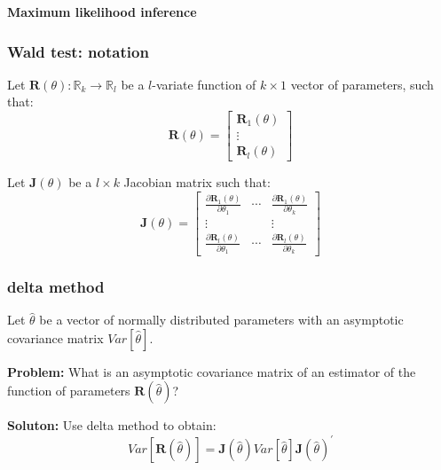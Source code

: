 \documentclass[notes,blackandwhite,mathsans]{beamer}
\begin{document}
{
\begin{frame}

\begin{adjustwidth}{-0.5cm}{0cm}
\vspace{8.3cm}\Large
\textbf{{\color{mcxs5}Maximum likelihood} {\color{mcxs2}inference}}
\end{adjustwidth}

\end{frame}
}



\begin{frame}
\frametitle{Wald test: notation}
\small

{\color{mcxs3}Let} $\mathbf{R}(\theta): \mathbb{R}_k\rightarrow\mathbb{R}_l$ {\color{mcxs3}be a} $l${\color{mcxs3}-variate function of} $k\times 1$ {\color{mcxs3}vector of parameters, such that:}
$$ \mathbf{R}(\theta) = \begin{bmatrix} \mathbf{R}_1(\theta) \\ \vdots \\ \mathbf{R}_l(\theta) \end{bmatrix} $$

{\color{mcxs3}Let} $\mathbf{J}(\theta)$ {\color{mcxs3}be a} $l\times k$ {\color{mcxs2}Jacobian matrix} {\color{mcxs3}such that:}
$$ \mathbf{J}(\theta) = \begin{bmatrix} \frac{\partial\mathbf{R}_1(\theta)}{\partial\theta_1} & \cdots & \frac{\partial\mathbf{R}_1(\theta)}{\partial\theta_k} \\ \vdots & & \vdots \\ \frac{\partial\mathbf{R}_l(\theta)}{\partial\theta_1} & \cdots & \frac{\partial\mathbf{R}_l(\theta)}{\partial\theta_k} \end{bmatrix} $$
\end{frame}


\begin{frame}
\frametitle{delta method}
\small

{\color{mcxs3}Let} $\hat\theta$ {\color{mcxs3}be a vector of {\color{mcxs2}normally distributed} parameters with an asymptotic covariance matrix} $Var[\hat\theta]$.

\vspace{1cm}\textbf{Problem:} {\color{mcxs3}What is an {\color{mcxs2}asymptotic} covariance matrix of an estimator of the  function of parameters} $\mathbf{R}(\hat\theta)$?

\vspace{1cm}\textbf{Soluton:} {\color{mcxs3}Use} delta method {\color{mcxs3}to obtain:}
$$ Var\left[ \mathbf{R}(\hat\theta) \right] = \mathbf{J}(\hat\theta)Var[\hat\theta]\mathbf{J}(\hat\theta)^{'} $$

\end{frame}
\end{document}
